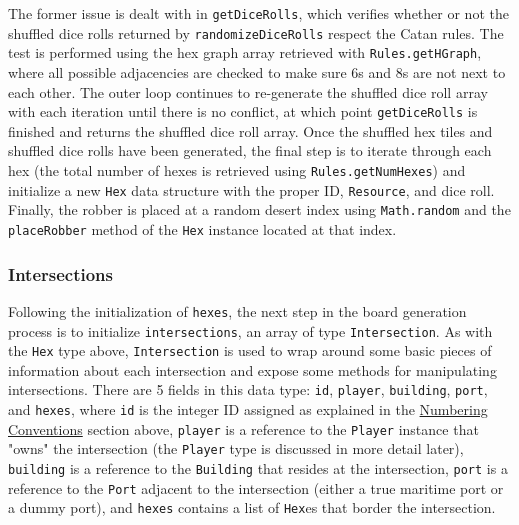 \documentclass[pageno]{jpaper}
\begin{document}
\begin{doublespacing}
The former issue is dealt with in \lstinline$getDiceRolls$, which verifies whether or not the shuffled dice rolls returned by \lstinline$randomizeDiceRolls$ respect the Catan rules. The test is performed using the hex graph array retrieved with \lstinline$Rules.getHGraph$, where all possible adjacencies are checked to make sure 6s and 8s are not next to each other. The outer loop continues to re-generate the shuffled dice roll array with each iteration until there is no conflict, at which point \lstinline$getDiceRolls$ is finished and returns the shuffled dice roll array. Once the shuffled hex tiles and shuffled dice rolls have been generated, the final step is to iterate through each hex (the total number of hexes is retrieved using \lstinline$Rules.getNumHexes$) and initialize a new \lstinline$Hex$ data structure with the proper ID, \lstinline$Resource$, and dice roll. Finally, the robber is placed at a random desert index using \lstinline$Math.random$ and the \lstinline$placeRobber$ method of the \lstinline$Hex$ instance located at that index.

\hypertarget{sec:intersections}{}
\subsubsection{Intersections}

Following the initialization of \lstinline$hexes$, the next step in the board generation process is to initialize \lstinline$intersections$, an array of type \lstinline$Intersection$. As with the \lstinline$Hex$ type above, \lstinline$Intersection$ is used to wrap around some basic pieces of information about each intersection and expose some methods for manipulating intersections. There are 5 fields in this data type: \lstinline$id$, \lstinline$player$, \lstinline$building$, \lstinline$port$, and \lstinline$hexes$, where \lstinline$id$ is the integer ID assigned as explained in the \hyperlink{sec:numbering_conventions}{Numbering Conventions} section above, \lstinline$player$ is a reference to the \lstinline$Player$ instance that "owns" the intersection (the \lstinline$Player$ type is discussed in more detail later), \lstinline$building$ is a reference to the \lstinline$Building$ that resides at the intersection, \lstinline$port$ is a reference to the \lstinline$Port$ adjacent to the intersection (either a true maritime port or a dummy port), and \lstinline$hexes$ contains a list of \lstinline$Hex$es that border the intersection. 


\end{doublespacing}
\end{document}
